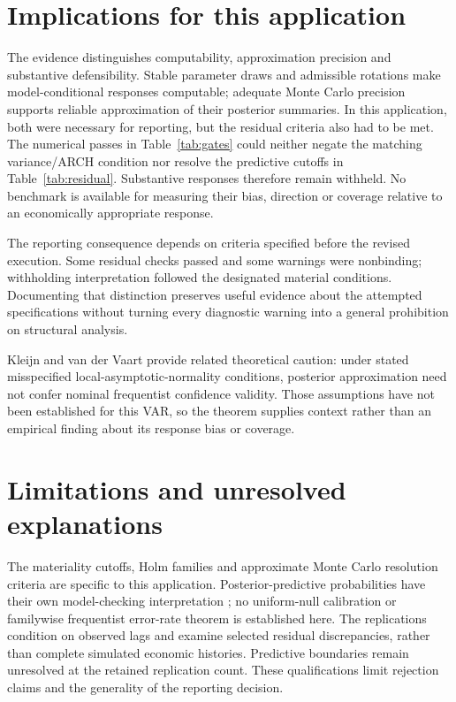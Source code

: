 \documentclass[11pt,a4paper]{article}
\begin{document}
\section{Implications for this application}
The evidence distinguishes computability, approximation precision and substantive defensibility. Stable parameter draws and admissible rotations make model-conditional responses computable; adequate Monte Carlo precision supports reliable approximation of their posterior summaries. In this application, both were necessary for reporting, but the residual criteria also had to be met. The numerical passes in Table~\ref{tab:gates} could neither negate the matching variance/ARCH condition nor resolve the predictive cutoffs in Table~\ref{tab:residual}. Substantive responses therefore remain withheld. No benchmark is available for measuring their bias, direction or coverage relative to an economically appropriate response.

The reporting consequence depends on criteria specified before the revised execution. Some residual checks passed and some warnings were nonbinding; withholding interpretation followed the designated material conditions. Documenting that distinction preserves useful evidence about the attempted specifications without turning every diagnostic warning into a general prohibition on structural analysis.

Kleijn and van der Vaart \cite{kvv2012} provide related theoretical caution: under stated misspecified local-asymptotic-normality conditions, posterior approximation need not confer nominal frequentist confidence validity. Those assumptions have not been established for this VAR, so the theorem supplies context rather than an empirical finding about its response bias or coverage.

\section{Limitations and unresolved explanations}
The materiality cutoffs, Holm families and approximate Monte Carlo resolution criteria are specific to this application. Posterior-predictive probabilities have their own model-checking interpretation \cite{gms1996}; no uniform-null calibration or familywise frequentist error-rate theorem is established here. The replications condition on observed lags and examine selected residual discrepancies, rather than complete simulated economic histories. Predictive boundaries remain unresolved at the retained replication count. These qualifications limit rejection claims and the generality of the reporting decision.
\end{document}
